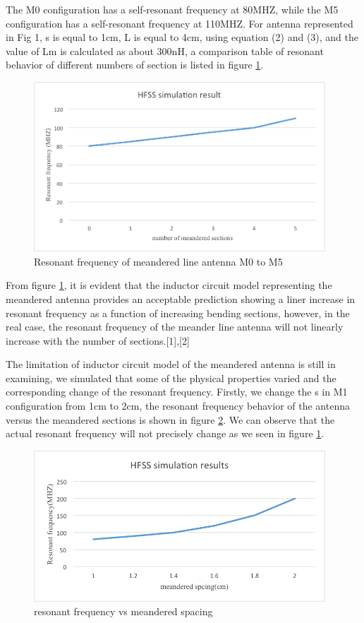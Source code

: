 The M0 configuration has a self-resonant frequency at 80MHZ, while the M5 configuration has a self-resonant frequency at 110MHZ. For antenna represented in Fig 1, s is equal to 1cm, L is equal to 4cm, using equation (2) and (3), and the value of Lm is calculated as about 300nH, a comparison table of resonant behavior of different numbers of section is listed in figure \ref{fig:efield_fig3}.

\begin{figure}[h]
	\begin{center}
		\includegraphics[width=4.3in]{./images/SG_fig3.png}
		\caption{Resonant frequency of meandered line antenna M0 to M5}
		\label{fig:efield_fig3}
	\end{center}
\end{figure}

From figure \ref{fig:efield_fig3}, it is evident that the inductor circuit model representing the meandered antenna provides an acceptable prediction showing a liner increase in resonant frequency as a function of increasing bending sections, however, in the real case, the resonant frequency of the meander line antenna will not linearly increase with the number of sections.[1],[2]

The limitation of inductor circuit model of the meandered antenna is still in examining, we simulated that some of the physical properties varied and the corresponding change of the resonant frequency. Firstly, we change the s in M1 configuration from 1cm to 2cm, the resonant frequency behavior of the antenna versus the meandered sections is shown in figure \ref{fig:efield_fig4}. We can observe that the actual resonant frequency will not precisely change as we seen in figure \ref{fig:efield_fig3}. 

\begin{figure}[h]
	\begin{center}
		\includegraphics[width=4.3in]{./images/SG_fig4.png}
		\caption{resonant frequency vs meandered spacing}
		\label{fig:efield_fig4}
	\end{center}
\end{figure}

